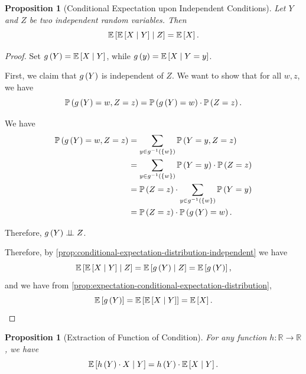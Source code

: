 \documentclass{article}
\newtheorem{proposition}[theorem]{Proposition}
\theoremstyle{definition}
\theoremstyle{remark}
\newcommand{\RR}{\mathbb{R}}
\newcommand{\Prob}{\mathbb{P}}
\newcommand{\Expt}{\mathbb{E}}
\newcommand{\Conditional}[2]{#1\mid #2}
\newcommand{\inverse}{^{-1}}
\newcommand{\functiondomain}[3]{#1:#2\to #3}
\newcommand{\indp}{\mathrel{\perp\!\!\!\perp}}
\begin{document}
\begin{proposition}[Conditional Expectation upon Independent Conditions]
    \label{prop:conditional-expectation-independent-conditions}%
    Let \(Y\) and \(Z\) be two independent random variables. Then
    \[
        \Expt\bqty{\Conditional{\Expt\bqty{\Conditional{X}{Y}}}{Z}} = \Expt\bqty{X}.
    \]
\end{proposition}

\begin{proof}
    Set \(g\pqty{Y} = \Expt\bqty{\Conditional{X}{Y}}\), while \(g\pqty{y} = \Expt\bqty{\Conditional{X}{Y = y}}\).

    First, we claim that \(g\left(Y\right)\) is independent of \(Z\). We want to show that for all \(w, z\), we have
    \[
        \Prob\pqty{g\pqty{Y} = w, Z = z} = \Prob\pqty{g\pqty{Y} = w} \cdot \Prob\pqty{Z = z}.
    \]

    We have
    \begin{align*}
        \Prob\pqty{g\pqty{Y} = w, Z = z} &= \sum_{y \in g\inverse\pqty{\Bqty{w}}} \Prob\pqty{Y = y, Z = z} \\
        &= \sum_{y \in g\inverse\pqty{\Bqty{w}}} \Prob\pqty{Y = y} \cdot \Prob\pqty{Z = z} \\
        &= \Prob\pqty{Z = z} \cdot \sum_{y \in g\inverse\pqty{\Bqty{w}}} \Prob\pqty{Y = y} \\
        &= \Prob\pqty{Z = z} \cdot \Prob\pqty{g\pqty{Y} = w}.
    \end{align*}

    Therefore, \(g\pqty{Y} \indp Z\).

    Therefore, by \autoref{prop:conditional-expectation-distribution-independent} we have
    \[
        \Expt\bqty{\Conditional{\Expt\bqty{\Conditional{X}{Y}}}{Z}} = \Expt\bqty{\Conditional{g\pqty{Y}}{Z}} = \Expt\bqty{g\pqty{Y}},
    \]
    and we have from \autoref{prop:expectation-conditional-expectation-distribution},
    \[
        \Expt\bqty{g\pqty{Y}} = \Expt\bqty{\Expt\bqty{\Conditional{X}{Y}}} = \Expt\bqty{X}.
    \]
\end{proof}

\begin{proposition}[Extraction of Function of Condition]
    \label{prop:extraction-function-condition}%
    For any function \(\functiondomain{h}{\RR}{\RR}\), we have
    \[
        \Expt\bqty{\Conditional{h\pqty{Y} \cdot X}{Y}} = h\pqty{Y} \cdot \Expt\bqty{\Conditional{X}{Y}}.
    \]
\end{proposition}
\end{document}
